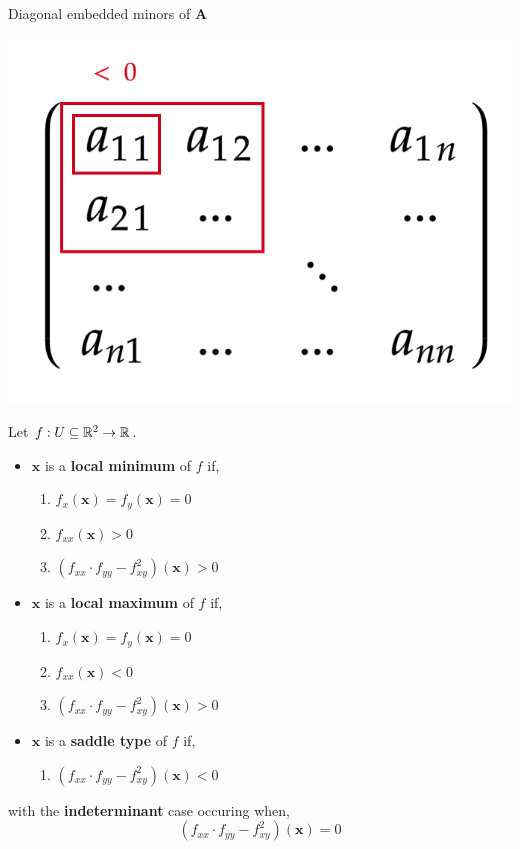 \begin{marginfigure}
Diagonal embedded minors of $\mathbf{A}$
\begin{center}
    \includegraphics[width=0.7\linewidth]{figures/wk-4/fig-43.png}
\end{center}
\end{marginfigure}

\begin{thm}
    Let $f: U \subseteq \mathbb{R}^2 \rightarrow \mathbb{R}$.
    \begin{itemize}
        \item $\mathbf{x}$ is a \textbf{local minimum} of $f$ if,
        \begin{enumerate}
            \item $f_x(\mathbf{x}) = f_y(\mathbf{x}) = 0$
            \item $f_{xx}(\mathbf{x}) > 0$
            \item $(f_{xx} \cdot f_{yy} - f_{xy}^2)(\mathbf{x}) > 0$
        \end{enumerate}
        \item $\mathbf{x}$ is a \textbf{local maximum} of $f$ if,
        \begin{enumerate}
            \item $f_x(\mathbf{x}) = f_y(\mathbf{x}) = 0$
            \item $f_{xx}(\mathbf{x}) < 0$
            \item $(f_{xx} \cdot f_{yy} - f_{xy}^2)(\mathbf{x}) > 0$
        \end{enumerate}
        \item $\mathbf{x}$ is a \textbf{saddle type} of $f$ if,
        \begin{enumerate}
            \item $(f_{xx} \cdot f_{yy} - f_{xy}^2)(\mathbf{x}) < 0$
        \end{enumerate}
    \end{itemize}
    with the \textbf{indeterminant} case occuring when,
    \[(f_{xx} \cdot f_{yy} - f_{xy}^2)(\mathbf{x}) = 0\]
\end{thm}

